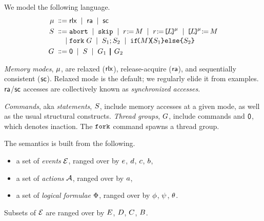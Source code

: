 We model the following language.
\begin{align*}
  \amode \BNFDEF& \mRLX
  \BNFSEP \mRA 
  \BNFSEP \mSC
  \\
  \aCmd
  \BNFDEF& \ABORT
  \BNFSEP \SKIP
  \BNFSEP \LET{\aReg}{\aExp}
  \BNFSEP \PRREF[\amode]{\cExp}{\aReg}
  \BNFSEP \PWREF[\amode]{\cExp}{\aExp}
  \\[-.5ex]
  \BNFSEP& \FORK{\aGrp}
  \BNFSEP \aCmd_1 \SEMI \aCmd_2
  \BNFSEP \IF{\aExp} \THEN \aCmd_1 \ELSE \aCmd_2 \FI
  \\
  \aGrp 
  \BNFDEF& \NIL
  \BNFSEP\THREAD{\aCmd}
  \BNFSEP\aGrp_1 \PAR \aGrp_2
\end{align*}

\emph{Memory modes}, $\mu$, are {relaxed} (${\mathsf{rlx}}$), {release-acquire}
(${\mathsf{ra}}$), and {sequentially consistent} (${\mathsf{sc}}$).  Relaxed mode is the
default; we regularly elide it from examples.  ${\mathsf{ra}}$/${\mathsf{sc}}$ accesses are
collectively known as \emph{synchronized accesses}.
 
\emph{Commands}, aka \emph{statements}, $S$, include memory accesses at a
given mode, as well as the usual structural constructs.
% 
\emph{Thread groups}, $G$, include commands and $\mathsf{0}$, which denotes
inaction. %
% 
The $\FORK{}$ command spawns a thread group.  %

The semantics is built from the following.
\begin{itemize}
\item a set of \emph{events} $\mathcal{E}$, ranged over by $e$, $d$,
  $c$, $b$, 
\item a set of \emph{actions} $\mathcal{A}$, ranged over by $a$, 
\item a set of \emph{logical formulae} $\Phi$, ranged over by $\phi$,
  $\psi$, $\theta$.
\end{itemize}
Subsets of $\mathcal{E}$ are ranged over by $E$, $D$, $C$,
$B$.

